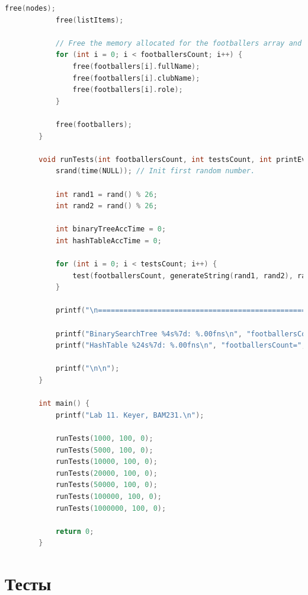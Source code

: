 \documentclass[12pt]{article}
\begin{document}
\begin{lstlisting}[language=C]
			free(nodes);
			free(listItems);
			
			// Free the memory allocated for the footballers array and the strings inside it.
			for (int i = 0; i < footballersCount; i++) {
				free(footballers[i].fullName);
				free(footballers[i].clubName);
				free(footballers[i].role);
			}
			
			free(footballers);
		}
		
		void runTests(int footballersCount, int testsCount, int printEveryTest) {
			srand(time(NULL)); // Init first random number.
			
			int rand1 = rand() % 26;
			int rand2 = rand() % 26;
			
			int binaryTreeAccTime = 0;
			int hashTableAccTime = 0;
			
			for (int i = 0; i < testsCount; i++) {
				test(footballersCount, generateString(rand1, rand2), rand1, rand2, &binaryTreeAccTime, &hashTableAccTime, printEveryTest);
			}
			
			printf("\n============================================================= Average from %d tests =============================================================\n\n", testsCount);
			
			printf("BinarySearchTree %4s%7d: %.00fns\n", "footballersCount=", footballersCount, (double)(binaryTreeAccTime / testsCount));
			printf("HashTable %24s%7d: %.00fns\n", "footballersCount=", footballersCount, (double)(hashTableAccTime / testsCount));
			
			printf("\n\n");
		}
		
		int main() {
			printf("Lab 11. Keyer, BAM231.\n");
			
			runTests(1000, 100, 0);
			runTests(5000, 100, 0);
			runTests(10000, 100, 0);
			runTests(20000, 100, 0);
			runTests(50000, 100, 0);
			runTests(100000, 100, 0);
			runTests(1000000, 100, 0);
			
			return 0;
		}

	\end{lstlisting}

	
	\section{Тесты}
	
\end{document}
